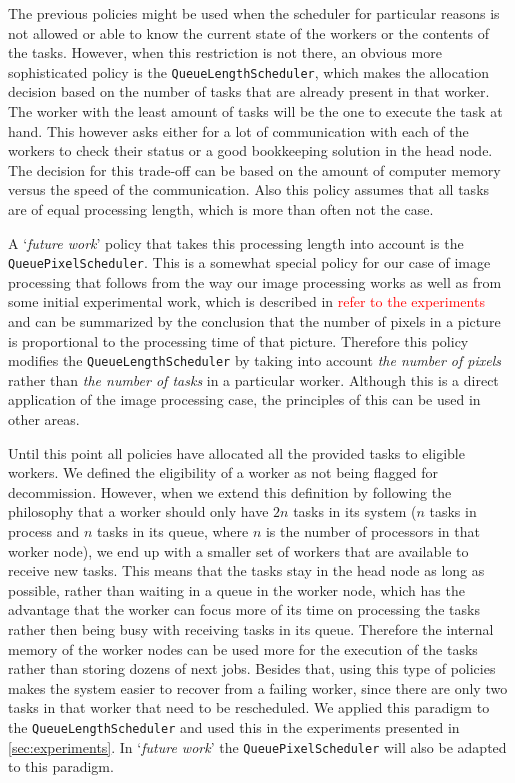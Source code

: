 \documentclass{stylesheet}
\begin{document}
The previous policies might be used when the scheduler for particular reasons is not allowed or able to know the current state of the workers or the contents of the tasks. However, when this restriction is not there, an obvious more sophisticated policy is the \texttt{QueueLengthScheduler}, which makes the allocation decision based on the number of tasks that are already present in that worker. The worker with the least amount of tasks will be the one to execute the task at hand. This however asks either for a lot of communication with each of the workers to check their status or a good bookkeeping solution in the head node. The decision for this trade-off can be based on the amount of computer memory versus the speed of the communication. Also this policy assumes that all tasks are of equal processing length, which is more than often not the case.

A `\textit{future work}' policy that takes this processing length into account is the \texttt{QueuePixelScheduler}. This is a somewhat special policy for our case of image processing that follows from the way our image processing works as well as from some initial experimental work, which is described in \textcolor{red}{refer to the experiments} and can be summarized by the conclusion that the number of pixels in a picture is proportional to the processing time of that picture. Therefore this policy modifies the \texttt{QueueLengthScheduler} by taking into account \textit{the number of pixels} rather than \textit{the number of tasks} in a particular worker. Although this is a direct application of the image processing case, the principles of this can be used in other areas.

Until this point all policies have allocated all the provided tasks to eligible workers. We defined the eligibility of a worker as not being flagged for decommission. However, when we extend this definition by following the philosophy that a worker should only have $2n$ tasks in its system ($n$ tasks in process and $n$ tasks in its queue, where $n$ is the number of processors in that worker node), we end up with a smaller set of workers that are available to receive new tasks. This means that the tasks stay in the head node as long as possible, rather than waiting in a queue in the worker node, which has the advantage that the worker can focus more of its time on processing the tasks rather then being busy with receiving tasks in its queue. Therefore the internal memory of the worker nodes can be used more for the execution of the tasks rather than storing dozens of next jobs. Besides that, using this type of policies makes the system easier to recover from a failing worker, since there are only two tasks in that worker that need to be rescheduled. We applied this paradigm to the \texttt{QueueLengthScheduler} and used this in the experiments presented in \cref{sec:experiments}. In `\textit{future work}' the \texttt{QueuePixelScheduler} will also be adapted to this paradigm.
\end{document}
